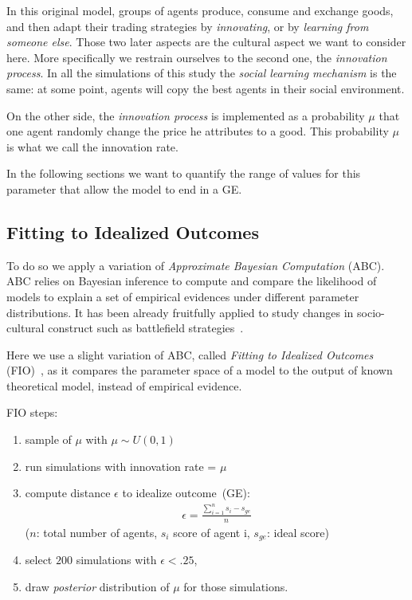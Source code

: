\documentclass[a1paper,fontscale=.47]{baposter}
\newcommand{\compresslist}{
	\setlength{\itemsep}{1pt}
	\setlength{\parskip}{0pt}
	\setlength{\parsep}{0pt}
}
\begin{document}
\begin{poster}
{In this original model, groups of agents produce, consume and exchange goods, and then adapt their trading strategies by \emph{innovating}, or by \emph{learning from someone else}. Those two later aspects are the cultural aspect we want to consider here. More specifically we restrain ourselves to the second one, the \emph{innovation process}. In all the simulations of this study the \emph{social learning mechanism} is the same: at some point, agents will copy the best agents in their social environment.

On the other side, the \emph{innovation process} is implemented as a probability $\mu$ that one agent randomly change the price he attributes to a good. This probability $\mu$ is what we call the innovation rate.

In the following sections we want to quantify the range of values for this parameter that allow the model to end in a GE.

\subsection*{Fitting to Idealized Outcomes}

To do so we apply a variation of \emph{Approximate Bayesian Computation} (ABC). ABC relies on Bayesian inference to compute and compare the likelihood of models to explain a set of empirical evidences under different parameter distributions. It has been already fruitfully applied to study changes in socio-cultural construct such as battlefield strategies~\cite{rubiocampillo2016modelselectioninhistoricalresearchusingapproximatebayesiancomputation}.

Here we use a slight variation of ABC, called \emph{Fitting to Idealized Outcomes} (FIO)~\cite{gallagher2015transitiontofarmingmorelikelyforsmallconservativegroupswithpropertyrightsbutincreasedproductivityisnotessential}, as it compares the parameter space of a model to the output of known theoretical model, instead of empirical evidence.

\vspace{.2cm}
{
	\footnotesize 
	FIO steps:
\vspace{-.3cm}
\setlength{\columnsep}{1mm}
	\begin{multicols*}{2}
	    \begin{enumerate}
		    \compresslist
		\item sample of $\mu$ with $\mu\sim U(0,1)$
		\item run simulations with innovation rate = $\mu$ 
		\item compute distance $\epsilon$ to idealize outcome~(GE):  
		    \begin{align*}
			\epsilon = \frac{ \sum_{i=1}^{n} s_i-s_{ge} }{n}   
		    \end{align*}
		    {\tiny ($n$: total number of agents, $s_i$ score of agent i, $s_{ge}$: ideal score)}
		    \vfill
		    \columnbreak
		\item select $200$ simulations with $\epsilon<.25$, 
		\item draw \emph{posterior} distribution of $\mu$ for those simulations.
	    \end{enumerate}
	\end{multicols*}
 }

}
\end{poster}
\end{document}
